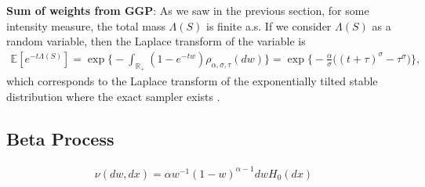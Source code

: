 \documentclass{article}
\begin{document}
\textbf{Sum of weights from GGP}: As we saw in the previous section, for some intensity measure, the total mass $\Lambda(S)$ is finite a.s. If we consider $\Lambda(S)$ as a random variable, then the Laplace transform of the variable is
\begin{align}
\mathbb{E}[e^{-t\Lambda(S)}] = \exp\bigg\{-\int_{\mathbb{R}_+} (1- e^{-tw}) \rho_{\alpha, \sigma, \tau}(dw) \bigg\} = \exp\bigg\{-\frac{\alpha}{\sigma}\big((t+\tau)^\sigma - \tau^\sigma\big)\bigg\},
\end{align}
which corresponds to the Laplace transform of the exponentially tilted stable distribution where the exact sampler exists \citep{devroye2009random,hofert2011sampling}.

\subsection{Beta Process}
\begin{align}
\nu(dw, dx) = \alpha w^{-1}(1-w)^{\alpha-1} dw H_0(dx)
\end{align}




\end{document}
